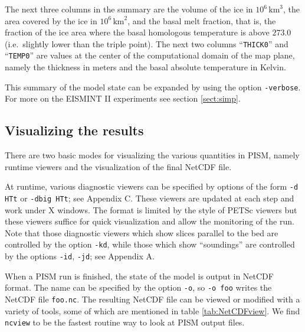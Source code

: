 \documentclass[11pt,final]{amsart}
\begin{document}
The next three columns in the summary are the volume of the ice in $10^6 \,\text{km}^3$, the area covered by the ice in $10^6\,\text{km}^2$, and the basal melt fraction, that is, the fraction of the ice area where the basal homologous temperature is above $273.0$ (i.e.~slightly lower than the triple point).  The next two columns ``\texttt{THICK0}'' and ``\texttt{TEMP0}'' are values at the center of the computational domain of the map plane, namely the thickness in meters and the basal absolute temperature in Kelvin.

This summary of the model state can be expanded by using the option \verb|-verbose|.  For more on the EISMINT II experiments see section \ref{sect:simp}.

\subsection{Visualizing the results}  There are two basic modes for visualizing the various quantities in PISM, namely runtime viewers and the visualization of the final NetCDF file.

At runtime, various diagnostic viewers can be specified by options of the form \verb|-d HTt| or \verb|-dbig HTt|; see Appendix C.  These viewers are updated at each step and work under X windows.  The format is limited by the style of PETSc viewers but these viewers suffice for quick visualization and allow the monitoring of the run.  Note that those diagnostic viewers which show slices parallel to the bed are controlled by the option \verb|-kd|, while those which show ``soundings'' are controlled by the options \verb|-id|, \verb|-jd|; see Appendix A.

When a PISM run is finished, the state of the model is output in NetCDF format.  The name can be specified by the option \verb|-o|, so \verb|-o foo| writes the NetCDF file \verb|foo.nc|.  The resulting NetCDF file can be viewed or modified with a variety of tools, some of which are mentioned in table \ref{tab:NetCDFview}.  We find \verb|ncview| to be the fastest routine way to look at PISM output files.
\end{document}
